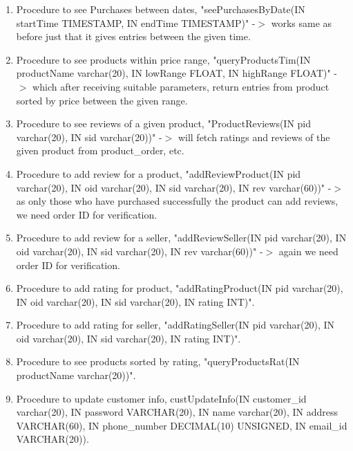 \documentclass[a4paper,12pt]{article}
\begin{document}
\begin{enumerate}
  \item Procedure to see Purchases between dates, "seePurchasesByDate(IN startTime TIMESTAMP, IN endTime TIMESTAMP)" -$>$ works same as before just that it gives entries between the given time.
  \item Procedure to see products within price range, "queryProductsTim(IN productName varchar(20), IN lowRange FLOAT, IN highRange FLOAT)" -$>$ which after receiving suitable parameters, return entries from product sorted by price between the given range.
  \item Procedure to see reviews of a given product, "ProductReviews(IN pid varchar(20), IN sid varchar(20))" -$>$ will fetch ratings and reviews of the given product from product\_order, etc.
  \item Procedure to add review for a product, "addReviewProduct(IN pid varchar(20), IN oid varchar(20), IN sid varchar(20), IN rev varchar(60))" -$>$ as only those who have purchased successfully the product can add reviews, we need order ID for verification.
  \item Procedure to add review for a seller, "addReviewSeller(IN pid varchar(20), IN oid varchar(20), IN sid varchar(20), IN rev varchar(60))" -$>$ again we need order ID for verification. 
  \item Procedure to add rating for product, "addRatingProduct(IN pid varchar(20), IN oid varchar(20), IN sid varchar(20), IN rating INT)".
  \item Procedure to add rating for seller, "addRatingSeller(IN pid varchar(20), IN oid varchar(20), IN sid varchar(20), IN rating INT)".
  \item Procedure to see products sorted by rating, "queryProductsRat(IN productName varchar(20))".
  \item Procedure to update customer info, custUpdateInfo(IN customer\_id varchar(20), IN password VARCHAR(20), IN name varchar(20), IN address VARCHAR(60), IN phone\_number DECIMAL(10) UNSIGNED, IN email\_id VARCHAR(20)).
\end{enumerate}
\end{document}
